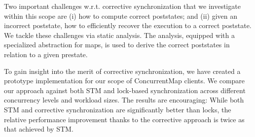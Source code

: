 Two important challenges w.r.t. corrective synchronization that we investigate within this scope are (i) how to compute correct poststates; and (ii) given an incorrect poststate, how to efficiently recover the execution to a correct poststate. 
We tackle these challenges via static analysis. The analysis, equipped with a specialized abstraction for maps, is used to derive the correct poststates in relation to a given prestate. 

To gain insight into the merit of corrective synchronization, we have created a prototype implementation for our scope of {\sf ConcurrentMap} clients. We compare our approach against both STM and lock-based synchronization across different concurrency levels and workload sizes. The results are encouraging: While both STM and corrective synchronization are significantly better than locks, the relative performance improvement thanks to the corrective approach is twice as that achieved by STM.
%
%
%
%


